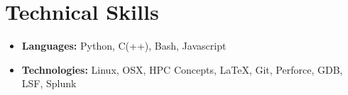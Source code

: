 \documentclass[11pt,letterpaper,sans]{moderncv}
\begin{document}
\section{Technical Skills}


\begin{itemize}
\item[]  \textbf{Languages:} Python, C(++), Bash, Javascript
\vspace{3pt}
\item[]  \textbf{Technologies:} Linux, OSX, HPC Concepts, LaTeX, Git, Perforce, GDB, LSF, Splunk

\end{itemize}


%
%


\end{document}
